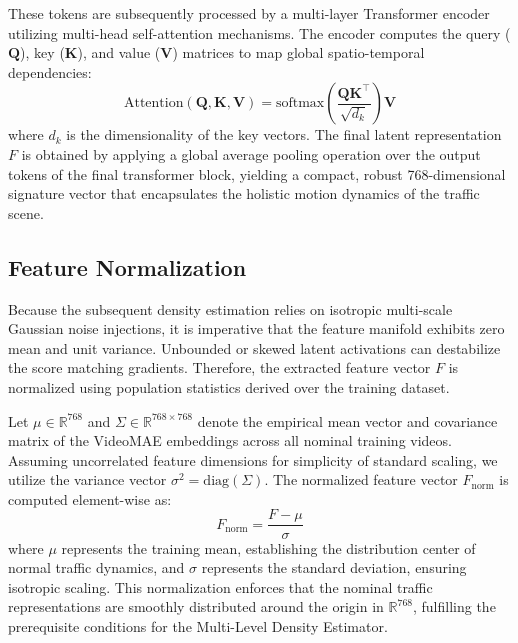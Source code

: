 \documentclass[conference]{IEEEtran}
\begin{document}
These tokens are subsequently processed by a multi-layer Transformer encoder utilizing multi-head self-attention mechanisms. The encoder computes the query ($\mathbf{Q}$), key ($\mathbf{K}$), and value ($\mathbf{V}$) matrices to map global spatio-temporal dependencies:
\begin{equation}
\text{Attention}(\mathbf{Q}, \mathbf{K}, \mathbf{V}) = \text{softmax}\left(\frac{\mathbf{Q} \mathbf{K}^\top}{\sqrt{d_k}}\right) \mathbf{V}
\label{eq:self_attention}
\end{equation}
where $d_k$ is the dimensionality of the key vectors. The final latent representation $F$ is obtained by applying a global average pooling operation over the output tokens of the final transformer block, yielding a compact, robust 768-dimensional signature vector that encapsulates the holistic motion dynamics of the traffic scene.

\subsection{Feature Normalization}
\label{subsec:feature_normalization}

Because the subsequent density estimation relies on isotropic multi-scale Gaussian noise injections, it is imperative that the feature manifold exhibits zero mean and unit variance. Unbounded or skewed latent activations can destabilize the score matching gradients. Therefore, the extracted feature vector $F$ is normalized using population statistics derived over the training dataset.

Let $\mu \in \mathbb{R}^{768}$ and $\Sigma \in \mathbb{R}^{768 \times 768}$ denote the empirical mean vector and covariance matrix of the VideoMAE embeddings across all nominal training videos. Assuming uncorrelated feature dimensions for simplicity of standard scaling, we utilize the variance vector $\sigma^2 = \text{diag}(\Sigma)$. The normalized feature vector $F_{\text{norm}}$ is computed element-wise as:
\begin{equation}
F_{\text{norm}} = \frac{F - \mu}{\sigma}
\label{eq:normalization}
\end{equation}
where $\mu$ represents the training mean, establishing the distribution center of normal traffic dynamics, and $\sigma$ represents the standard deviation, ensuring isotropic scaling. This normalization enforces that the nominal traffic representations are smoothly distributed around the origin in $\mathbb{R}^{768}$, fulfilling the prerequisite conditions for the Multi-Level Density Estimator.
\end{document}
